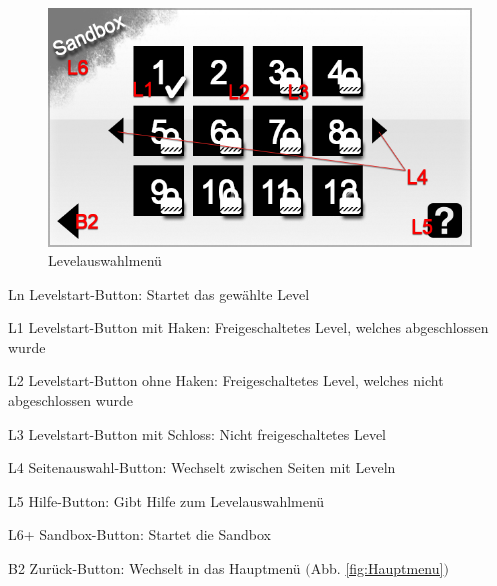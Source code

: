 \begin{figure}[H]
\centering
\includegraphics[scale=0.55]{../gui/_jpeg_numeration/level.jpg}
\caption{Levelauswahlmenü}
\label{fig:Levelauswahlmenu}
\end{figure}
\begin{description*}
\item[Ln] Levelstart-Button: Startet das gewählte Level
\item[L1] Levelstart-Button mit Haken: Freigeschaltetes Level, welches abgeschlossen wurde
\item[L2] Levelstart-Button ohne Haken: Freigeschaltetes Level, welches nicht abgeschlossen wurde
\item[L3] Levelstart-Button mit Schloss: Nicht freigeschaltetes Level
\item[L4] Seitenauswahl-Button: Wechselt zwischen Seiten mit Leveln
\item[L5] Hilfe-Button: Gibt Hilfe zum Levelauswahlmenü
\item[L6+] Sandbox-Button: Startet die Sandbox
\item[B2] Zurück-Button: Wechselt in das Hauptmenü $($Abb. \ref{fig:Hauptmenu}$)$
\end{description*}



